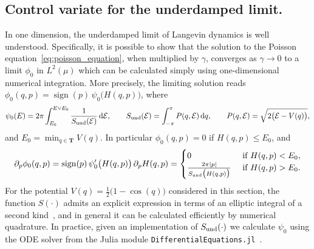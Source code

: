 \documentclass[11pt,a4paper]{article}
\DeclareMathOperator{\sign}{sign}
\newcommand{\torus}{\mathbf T}
\renewcommand{\d}{\mathrm d}
\theoremstyle{plain}
\numberwithin{equation}{section}
\renewcommand{\leq}{\leqslant}
\begin{document}
\subsection{Control variate for the underdamped limit.}%
\label{sub:underdamped_approach}
In one dimension,
the underdamped limit of Langevin dynamics is well understood.
Specifically, it is possible to show that the solution to the Poisson equation~\eqref{eq:poisson_equation},
when multiplied by $\gamma$,
converges as $\gamma \to 0$ to a limit $\phi_0$ in $L^2(\mu)$ which can be calculated simply using one-dimensional numerical integration.
More precisely,
the limiting solution reads $\phi_0(q,p) = \sign(p) \, \psi_0\bigl(H(q,p)\bigr)$,
where
\[
    \psi_0(E) = 2 \pi \int_{E_0}^{E \vee E_0} \frac{1}{S_{\rm und}(\mathcal E)} \, \d \mathcal E,
    \qquad S_{\rm und}(\mathcal E) = \int_{-\pi}^{\pi} P(q, \mathcal E) \, \d q, \qquad P(q, \mathcal E) = \sqrt {2 \bigl(\mathcal E - V(q)\bigr)},
\]
and $E_0 = \min_{q \in \torus} V(q)$.
In particular $\phi_0(q,p) = 0$ if $H(q,p) \leq E_0$,
and
\[
    \partial_p \phi_0(q, p)
    = \sign(p) \, \psi_0'\bigl(H(q,p)\bigr) \, \partial_p H(q,p)
    =
    \begin{cases}
        0 & \text{ if $H(q,p) < E_0$}, \\
        \frac{2 \pi \abs{p}}{S_{\rm und}\bigl(H(q,p)\bigr)} & \text{ if $H(q,p) > E_0$}.
    \end{cases}
\]
For the potential $V(q) = \frac{1}{2} \bigl(1 - \cos(q)\bigr)$ considered in this section,
the function $S(\cdot)$ admits an explicit expression in terms of an elliptic integral of a second kind~\cite{MR2427108},
and in general it can be calculated efficiently by numerical quadrature.
In practice, given an implementation of $S_{\rm und}(\cdot)$ we calculate $\psi_0$ using the ODE solver from the Julia module \texttt{DifferentialEquations.jl}~\cite{rackauckas2017differentialequations}.
\end{document}

